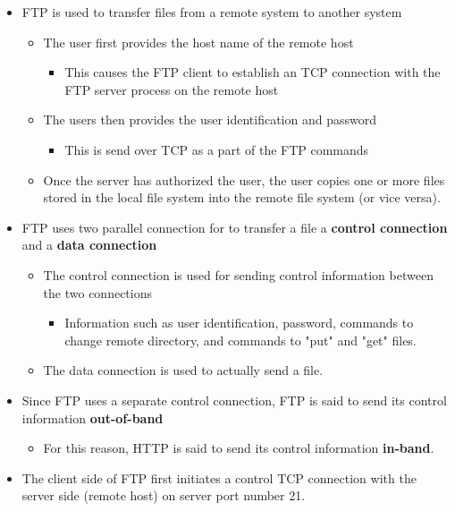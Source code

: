 \documentclass[11pt]{article}
\providecommand{\tightlist}{%
      \setlength{\itemsep}{0pt}\setlength{\parskip}{0pt}}
\begin{document}
\begin{itemize}
\tightlist
\item
  FTP is used to transfer files from a remote system to another system

  \begin{itemize}
  \tightlist
  \item
    The user first provides the host name of the remote host

    \begin{itemize}
    \tightlist
    \item
      This causes the FTP client to establish an TCP connection with the
      FTP server process on the remote host
    \end{itemize}
  \item
    The users then provides the user identification and password

    \begin{itemize}
    \tightlist
    \item
      This is send over TCP as a part of the FTP commands
    \end{itemize}
  \item
    Once the server has authorized the user, the user copies one or more
    files stored in the local file system into the remote file system
    (or vice versa).
  \end{itemize}
\item
  FTP uses two parallel connection for to transfer a file a
  \textbf{control connection} and a \textbf{data connection}

  \begin{itemize}
  \tightlist
  \item
    The control connection is used for sending control information
    between the two connections

    \begin{itemize}
    \tightlist
    \item
      Information such as user identification, password, commands to
      change remote directory, and commands to "put" and "get" files.
    \end{itemize}
  \item
    The data connection is used to actually send a file.
  \end{itemize}
\item
  Since FTP uses a separate control connection, FTP is said to send its
  control information \textbf{out-of-band}

  \begin{itemize}
  \tightlist
  \item
    For this reason, HTTP is said to send its control information
    \textbf{in-band}.
  \end{itemize}
\item
  The client side of FTP first initiates a control TCP connection with
  the server side (remote host) on server port number 21.


\end{itemize}
\end{document}
